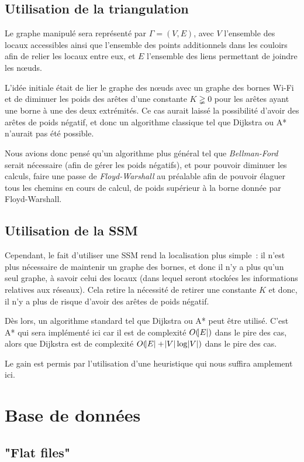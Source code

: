 \documentclass[11pt,a4paper]{article}
\begin{document}
	\subsection{Utilisation de la triangulation}
		Le graphe manipulé sera représenté par $\Gamma = (V, E)$, avec $V$ l'ensemble des locaux accessibles ainsi que l'ensemble des points additionnels dans les couloirs
		afin de relier les locaux entre eux, et $E$ l'ensemble des liens permettant de joindre les nœuds.

		L'idée initiale était de lier le graphe des nœuds avec un graphe des bornes Wi-Fi et de diminuer les poids des arêtes d'une constante $K \gneqq 0$ pour les arêtes
		ayant une borne à une des deux extrémités. Ce cas aurait laissé la possibilité d'avoir des arêtes de poids négatif, et donc un algorithme classique tel que Dijkstra
		ou A* n'aurait pas été possible.

		Nous avions donc pensé qu'un algorithme plus général tel que \textit{Bellman-Ford} serait nécessaire (afin de gérer les poids négatifs), et pour pouvoir diminuer
		les calculs, faire une passe de \textit{Floyd-Warshall} au préalable afin de pouvoir élaguer tous les chemins en cours de calcul, de poids supérieur à la borne
		donnée par Floyd-Warshall.

	\subsection{Utilisation de la SSM}
		Cependant, le fait d'utiliser une SSM rend la localisation plus simple~: il n'est plus nécessaire de maintenir un graphe des bornes, et donc il n'y a plus
		qu'un seul graphe, à savoir celui des locaux (dans lequel seront stockées les informations relatives aux réseaux). Cela retire la nécessité de retirer une
		constante $K$ et donc, il n'y a plus de risque d'avoir des arêtes de poids négatif.

		Dès lors, un algorithme standard tel que Dijkstra ou A* peut être utilisé. C'est A* qui sera implémenté ici car il est de complexité $O(\abs E)$ dans
		le pire des cas, alors que Dijkstra est de complexité $O(\abs E + \abs V\log\abs V)$ dans le pire des cas.

		Le gain est permis par l'utilisation d'une heuristique qui nous suffira amplement ici.

\section{Base de données}
  \subsection{"Flat files"}
\end{document}
